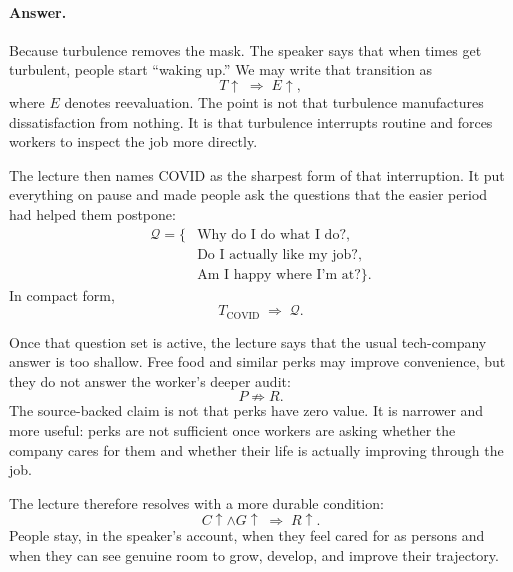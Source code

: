 \documentclass[11pt,oneside]{book}
\begin{document}
\paragraph{Answer.}
Because turbulence removes the mask. The speaker says that when times get turbulent, people start ``waking up.'' We may write that transition as
\[
T \uparrow \;\Rightarrow\; E \uparrow ,
\]
where \(E\) denotes reevaluation. The point is not that turbulence manufactures dissatisfaction from nothing. It is that turbulence interrupts routine and forces workers to inspect the job more directly.

The lecture then names COVID as the sharpest form of that interruption. It put everything on pause and made people ask the questions that the easier period had helped them postpone:
\begin{align}
\mathcal{Q}=\{&
\text{Why do I do what I do?},\nonumber\\
&\text{Do I actually like my job?},\nonumber\\
&\text{Am I happy where I'm at?}\}.
\end{align}
In compact form,
\[
T_{\text{COVID}} \;\Rightarrow\; \mathcal{Q}.
\]

Once that question set is active, the lecture says that the usual tech-company answer is too shallow. Free food and similar perks may improve convenience, but they do not answer the worker's deeper audit:
\[
P \not\Rightarrow R.
\]
The source-backed claim is not that perks have zero value. It is narrower and more useful: perks are not sufficient once workers are asking whether the company cares for them and whether their life is actually improving through the job.

The lecture therefore resolves with a more durable condition:
\[
C \uparrow \land G \uparrow \;\Rightarrow\; R \uparrow .
\]
People stay, in the speaker's account, when they feel cared for as persons and when they can see genuine room to grow, develop, and improve their trajectory.
\end{document}
